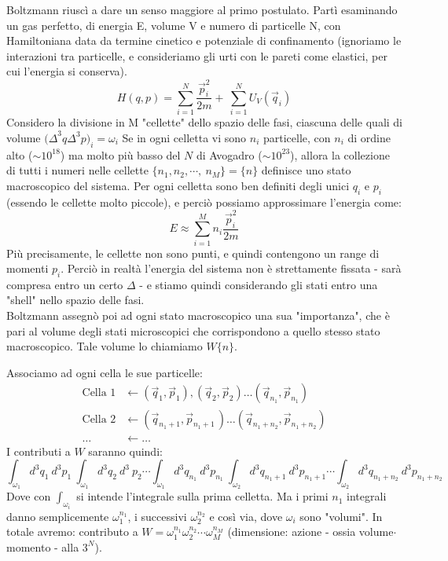 \documentclass[../MeccanicaStatistica.tex]{subfiles}
\begin{document}
Boltzmann riuscì a dare un senso maggiore al primo postulato. Partì esaminando un gas perfetto, di energia E, volume V e numero di particelle N, con Hamiltoniana data da termine cinetico e potenziale di confinamento (ignoriamo le interazioni tra particelle, e consideriamo gli urti con le pareti come elastici, per cui l'energia si conserva).
\[
H\left(q,p\right)= \sum_{i=1}^{N}{\frac{{\vec{p}}_i^2}{2m}+\ \sum_{i=1}^{N}{U_V\left({\vec{q}}_i\right)}}
\]
Considero la divisione in M "cellette" dello spazio delle fasi, ciascuna delle quali di volume ${(\Delta}^3q \Delta^3p)_i=\omega_i$
Se in ogni celletta vi sono $n_i$ particelle, con $n_i$ di ordine alto ($\sim{10}^{18}$) ma molto più basso del $N$ di Avogadro ($\sim{10}^{23}$), allora la collezione di tutti i numeri nelle cellette $\{n_1,n_2,\cdots,\ n_M\}=\{n\}$ definisce uno stato macroscopico del sistema. 
Per ogni celletta sono ben definiti degli unici $q_i$ e $p_i$ (essendo le cellette molto piccole), e perciò possiamo approssimare l'energia come:
\[
E\approx\sum_{i=1}^{M}{n_i\frac{{\vec{p}}_i^2}{2m}}
\]
Più precisamente, le cellette non sono punti, e quindi contengono un range di momenti $p_i$. Perciò in realtà l'energia del sistema non è strettamente fissata - sarà compresa entro un certo $\Delta$ - e stiamo quindi considerando gli stati entro una "shell" nello spazio delle fasi.\\
Boltzmann assegnò poi ad ogni stato macroscopico una sua "importanza", che è pari al volume degli stati microscopici che corrispondono a quello stesso stato macroscopico. Tale volume lo chiamiamo $W\{n\}$.

Associamo ad ogni cella le sue particelle:
\begin{align*}
    \text{Cella 1} &\leftarrow\left({\vec{q}}_1,{\vec{p}}_1\right), \left({\vec{q}}_2,{\vec{p}}_2\right)\dots({\vec{q}}_{n_1},{\vec{p}}_{n_1})\\
    \text{Cella 2} & \leftarrow\left({\vec{q}}_{n_1+1},{\vec{p}}_{n_1+1\ }\right)\dots\left({\vec{q}}_{n_1+n_2},{\vec{p}}_{n_1+n_2}\right)\\
    \dots &\leftarrow \dots
\end{align*}
I contributi a $W$ saranno quindi:
\[
\int_{\omega_1}{d^3q_1\ d^3p_1\ \int_{\omega_1}{d^3q_2\ d^3\ p_2\cdots\int_{\omega_1}{d^3q_{n_1}\ d^3p_{n_1}\ \int_{\omega_2}{d^3q_{n_1+1}\ d^3p_{n_1+1}\cdots\int_{\omega_2}{d^3q_{n_1+n_2}\ d^3p_{n_1+n_2}}}\ }}}
\]
Dove con $\int_{\omega_i}$  si intende l'integrale sulla prima celletta. Ma i primi $n_1$ integrali danno semplicemente $\omega_1^{n_1}$, i successivi $\omega_2^{n_2}$ e così via, dove $\omega_i$ sono "volumi".
In totale avremo: contributo a $W= \omega_1^{n_1}\omega_2^{n_2}\cdots\omega_M^{n_M}$ (dimensione: azione - ossia volume$\cdot$momento - alla $3^N$).
\end{document}
